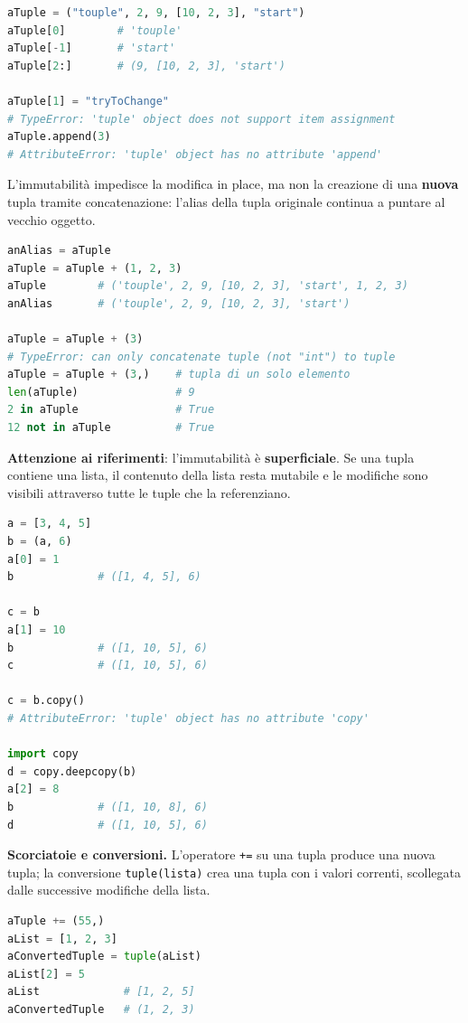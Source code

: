 \documentclass[12pt]{extarticle}
\begin{document}
\begin{lstlisting}[language=Python]
aTuple = ("touple", 2, 9, [10, 2, 3], "start")
aTuple[0]        # 'touple'
aTuple[-1]       # 'start'
aTuple[2:]       # (9, [10, 2, 3], 'start')

aTuple[1] = "tryToChange"
# TypeError: 'tuple' object does not support item assignment
aTuple.append(3)
# AttributeError: 'tuple' object has no attribute 'append'
\end{lstlisting}

\noindent L'immutabilità impedisce la modifica in place, ma non la creazione di una \textbf{nuova} tupla tramite concatenazione: l'alias della tupla originale continua a puntare al vecchio oggetto.

\begin{lstlisting}[language=Python]
anAlias = aTuple
aTuple = aTuple + (1, 2, 3)
aTuple        # ('touple', 2, 9, [10, 2, 3], 'start', 1, 2, 3)
anAlias       # ('touple', 2, 9, [10, 2, 3], 'start')

aTuple = aTuple + (3)
# TypeError: can only concatenate tuple (not "int") to tuple
aTuple = aTuple + (3,)    # tupla di un solo elemento
len(aTuple)               # 9
2 in aTuple               # True
12 not in aTuple          # True
\end{lstlisting}

\noindent \textbf{Attenzione ai riferimenti}: l'immutabilità è \textbf{superficiale}. Se una tupla contiene una lista, il contenuto della lista resta mutabile e le modifiche sono visibili attraverso tutte le tuple che la referenziano.

\begin{lstlisting}[language=Python]
a = [3, 4, 5]
b = (a, 6)
a[0] = 1
b             # ([1, 4, 5], 6)

c = b
a[1] = 10
b             # ([1, 10, 5], 6)
c             # ([1, 10, 5], 6)

c = b.copy()
# AttributeError: 'tuple' object has no attribute 'copy'

import copy
d = copy.deepcopy(b)
a[2] = 8
b             # ([1, 10, 8], 6)
d             # ([1, 10, 5], 6)
\end{lstlisting}

\noindent \textbf{Scorciatoie e conversioni.} L'operatore \texttt{+=} su una tupla produce una nuova tupla; la conversione \texttt{tuple(lista)} crea una tupla con i valori correnti, scollegata dalle successive modifiche della lista.

\begin{lstlisting}[language=Python]
aTuple += (55,)
aList = [1, 2, 3]
aConvertedTuple = tuple(aList)
aList[2] = 5
aList             # [1, 2, 5]
aConvertedTuple   # (1, 2, 3)
\end{lstlisting}
\end{document}
